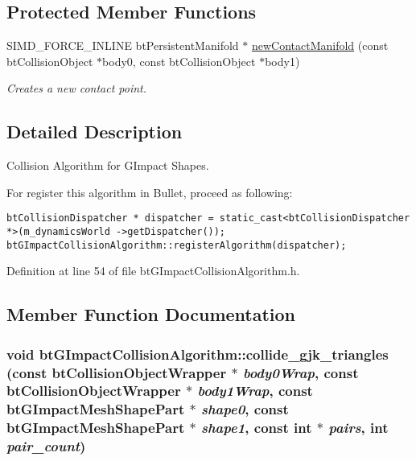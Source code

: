 \subsection*{Protected Member Functions}
\begin{CompactItemize}
\item 
\hypertarget{classbt_g_impact_collision_algorithm_39b6aae298182026902401b138ebd716}{
SIMD\_\-FORCE\_\-INLINE btPersistentManifold $\ast$ \hyperlink{classbt_g_impact_collision_algorithm_39b6aae298182026902401b138ebd716}{newContactManifold} (const btCollisionObject $\ast$body0, const btCollisionObject $\ast$body1)}
\label{classbt_g_impact_collision_algorithm_39b6aae298182026902401b138ebd716}

\begin{CompactList}\small\item\em Creates a new contact point. \item\end{CompactList}\end{CompactItemize}


\subsection{Detailed Description}
Collision Algorithm for GImpact Shapes. 

For register this algorithm in Bullet, proceed as following: 

\begin{Code}\begin{verbatim}btCollisionDispatcher * dispatcher = static_cast<btCollisionDispatcher *>(m_dynamicsWorld ->getDispatcher());
btGImpactCollisionAlgorithm::registerAlgorithm(dispatcher);
\end{verbatim}
\end{Code}

 

Definition at line 54 of file btGImpactCollisionAlgorithm.h.

\subsection{Member Function Documentation}
\hypertarget{classbt_g_impact_collision_algorithm_1cc907bcb394f7a95d609b1b56a5490e}{
\subsubsection[collide\_\-gjk\_\-triangles]{\setlength{\rightskip}{0pt plus 5cm}void btGImpactCollisionAlgorithm::collide\_\-gjk\_\-triangles (const btCollisionObjectWrapper $\ast$ {\em body0Wrap}, \/  const btCollisionObjectWrapper $\ast$ {\em body1Wrap}, \/  const {\bf btGImpactMeshShapePart} $\ast$ {\em shape0}, \/  const {\bf btGImpactMeshShapePart} $\ast$ {\em shape1}, \/  const int $\ast$ {\em pairs}, \/  int {\em pair\_\-count})}}
\label{classbt_g_impact_collision_algorithm_1cc907bcb394f7a95d609b1b56a5490e}


